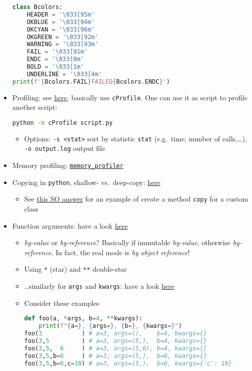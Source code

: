 \documentclass[a4paper,12pt,%
              final%
              ]{article}
\begin{document}
\begin{itemize}
\begin{lstlisting}[language=python]
class Bcolors:
    HEADER = '\033[95m'
    OKBLUE = '\033[94m'
    OKCYAN = '\033[96m'
    OKGREEN = '\033[92m'
    WARNING = '\033[93m'
    FAIL = '\033[91m'
    ENDC = '\033[0m'
    BOLD = '\033[1m'
    UNDERLINE = '\033[4m'
print(f'{Bcolors.FAIL}FAILED{Bcolors.ENDC}')
\end{lstlisting}
  \item Profiling: see \href{https://docs.python.org/3/library/profile.html}{here}, basically use \texttt{cProfile}. One can use it as script to profile another script:
\begin{lstlisting}[language=bash]
python -m cProfile script.py
\end{lstlisting}
    \begin{itemize}
      \item Options: \verb|-s <stat>| sort by statistic \texttt{stat} (e.g.\ time, number of calls,\ldots), \verb|-o output.log| output file
    \end{itemize}
  \item Memory profiling: \href{https://github.com/pythonprofilers/memory_profiler}{\texttt{memory\_profiler}}
  \item Copying in \texttt{python}, shallow- vs.\ deep-copy: \href{https://www.programiz.com/python-programming/shallow-deep-copy}{here}
    \begin{itemize}
      \item See \href{https://stackoverflow.com/a/46939443}{this SO answer} for an example of create a method \texttt{copy} for a custom class
    \end{itemize}
  \item Function arguments: have a look \href{https://www.python-course.eu/python3_passing_arguments.php}{here}
    \begin{itemize}
      \item \emph{by-value} or \emph{by-reference}? Basically if immutable \emph{by-value}, otherwise \emph{by-reference}. In fact, the real mode is \emph{by object reference}!
      \item Using \texttt{*} (star) and \texttt{**} double-star
      \item \ldots{}similarly for \texttt{args} and \texttt{kwargs}: have a look \href{https://realpython.com/python-kwargs-and-args/}{here}
      \item Consider these examples
\begin{lstlisting}[language=python]
def foo(a, *args, b=4, **kwargs):
    print(f"{a=}, {args=}, {b=}, {kwargs=}")
foo(3           ) # a=3, args=(),    b=4, kwargs={}
foo(3,5         ) # a=3, args=(5,),  b=4, kwargs={}
foo(3,5,  6     ) # a=3, args=(5,6), b=4, kwargs={}
foo(3,5,b=6     ) # a=3, args=(5,),  b=6, kwargs={}
foo(3,5,b=6,c=10) # a=3, args=(5,),  b=6, kwargs={'c': 10}


\end{lstlisting}
\end{itemize}
\end{itemize}
\end{document}
